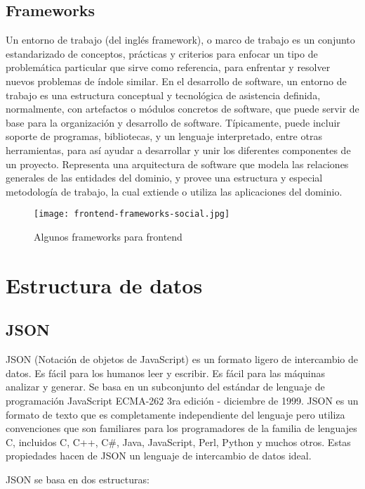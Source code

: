 \begin{enumerate}
\subsection{Frameworks}

\cite{wiki}Un entorno de trabajo (del inglés framework), o marco de trabajo es un conjunto estandarizado
de conceptos, prácticas y criterios para enfocar un tipo de problemática particular que sirve como
referencia, para enfrentar y resolver nuevos problemas de índole similar.
En el desarrollo de software, un entorno de trabajo es una estructura conceptual y tecnológica
de asistencia definida, normalmente, con artefactos o módulos concretos de software, que puede
servir de base para la organización y desarrollo de software. Típicamente, puede incluir soporte
de programas, bibliotecas, y un lenguaje interpretado, entre otras herramientas, para así ayudar a
desarrollar y unir los diferentes componentes de un proyecto.
Representa una arquitectura de software que modela las relaciones generales de las entidades del
dominio, y provee una estructura y especial metodología de trabajo, la cual extiende o utiliza las
aplicaciones del dominio.

\begin{figure}[H]
	\center
	\texttt{[image: frontend-frameworks-social.jpg]}
	\caption{Algunos frameworks para frontend}
	\label{fig:super}
\end{figure}

\section{Estructura de datos}

\subsection{JSON}
\cite{json} JSON (Notación de objetos de JavaScript) es un formato ligero de intercambio de datos. Es fácil para los humanos leer y escribir. Es fácil para las máquinas analizar y generar. Se basa en un subconjunto del estándar de lenguaje de programación JavaScript ECMA-262 3ra edición - diciembre de 1999. JSON es un formato de texto que es completamente independiente del lenguaje pero utiliza convenciones que son familiares para los programadores de la familia de lenguajes C, incluidos C, C++, C#, Java, JavaScript, Perl, Python y muchos otros. Estas propiedades hacen de JSON un lenguaje de intercambio de datos ideal.

JSON se basa en dos estructuras:


\end{enumerate}
